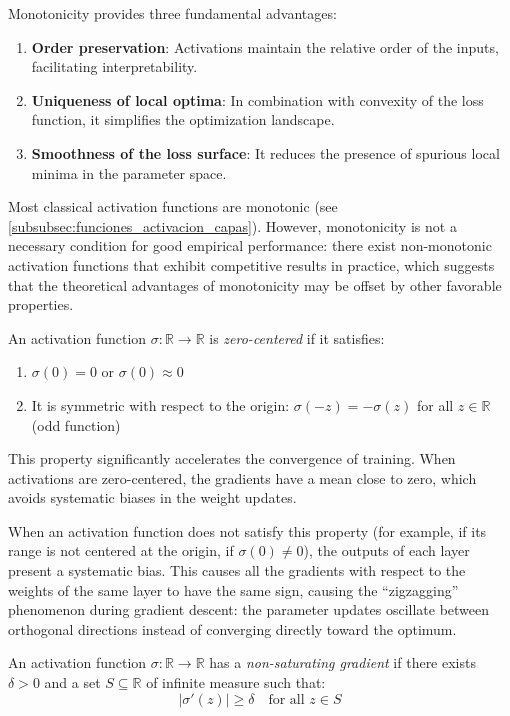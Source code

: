 Monotonicity provides three fundamental advantages:
\begin{enumerate}
	\item \textbf{Order preservation}: Activations maintain the relative order of the inputs, facilitating interpretability.
	\item \textbf{Uniqueness of local optima}: In combination with convexity of the loss function, it simplifies the optimization landscape.
	\item \textbf{Smoothness of the loss surface}: It reduces the presence of spurious local minima in the parameter space.
\end{enumerate}

Most classical activation functions are monotonic (see \autoref{subsubsec:funciones_activacion_capas}). However, monotonicity is not a necessary condition for good empirical performance: there exist non-monotonic activation functions that exhibit competitive results in practice, which suggests that the theoretical advantages of monotonicity may be offset by other favorable properties.

\begin{definition}\label{prop:zero_centered}
	An activation function $\sigma: \mathbb{R} \to \mathbb{R}$ is \textit{zero-centered} if it satisfies:
	\begin{enumerate}
		\item $\sigma(0) = 0$ or $\sigma(0) \approx 0$
		\item It is symmetric with respect to the origin: $\sigma(-z) = -\sigma(z)$ for all $z \in \mathbb{R}$ (odd function)
	\end{enumerate}
\end{definition}

This property significantly accelerates the convergence of training. When activations are zero-centered, the gradients have a mean close to zero, which avoids systematic biases in the weight updates.

When an activation function does not satisfy this property (for example, if its range is not centered at the origin, if $\sigma(0) \neq 0$), the outputs of each layer present a systematic bias. This causes all the gradients with respect to the weights of the same layer to have the same sign, causing the ``zigzagging'' phenomenon during gradient descent: the parameter updates oscillate between orthogonal directions instead of converging directly toward the optimum.

\begin{definition}\label{prop:gradiente_no_saturante}
	An activation function $\sigma: \mathbb{R} \to \mathbb{R}$ has a \textit{non-saturating gradient} if there exists $\delta > 0$ and a set $S \subseteq \mathbb{R}$ of infinite measure such that:
	\[
	|\sigma'(z)| \geq \delta \quad \text{for all } z \in S
	\]
\end{definition}

